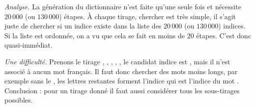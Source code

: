 \documentclass[11pt,class=report,crop=false]{standalone}
\begin{document}
\begin{cours}
\emph{Analyse.}
La génération du dictionnaire n'est faite qu'une seule fois et nécessite $20\,000$ (ou $130\,000$) étapes.
\`A chaque tirage, chercher est très simple, il s'agit juste de chercher si un indice existe dans la liste des $20\,000$ (ou $130\,000$) indices. Si la liste est ordonnée, on a vu que cela se fait en moins de $20$ étapes. C'est donc quasi-immédiat.

\bigskip

\emph{Une difficulté.} Prenons le tirage , , , , , le candidat indice est , mais il n'est associé à aucun mot français. Il faut donc chercher des mots moins longs, par exemple sans le , les lettres restantes forment l'indice  qui est l'indice du mot .
Conclusion : pour un tirage donné il faut aussi considérer tous les sous-tirages possibles.
 
\end{cours}

\end{document}
